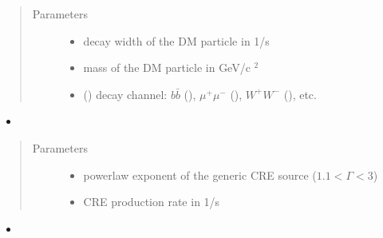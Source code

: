 \documentclass[letterpaper,10pt,english]{sphinxmanual}
\begin{document}
\begin{fulllineitems}
\begin{itemize}
\end{itemize}
\begin{quote}\begin{description}
\item[{Parameters}] \leavevmode\begin{itemize}
\item {} 
\sphinxAtStartPar
{} \textendash{} decay width of the DM particle in 1/s

\item {} 
\sphinxAtStartPar
{} \textendash{} mass of the DM particle in GeV/c \({}^2\)

\item {} 
\sphinxAtStartPar
{} () \textendash{} decay channel: \(b\bar b\) (), \(\mu^+ \mu^-\) (), \(W^+ W^-\) (), etc.

\end{itemize}

\end{description}\end{quote}
\begin{itemize}
\item {} 
\sphinxAtStartPar
{}

\end{itemize}
\begin{quote}\begin{description}
\item[{Parameters}] \leavevmode\begin{itemize}
\item {} 
\sphinxAtStartPar
{} \textendash{} power\sphinxhyphen{}law exponent of the generic CRE source (\(1.1 < \Gamma < 3\))

\item {} 
\sphinxAtStartPar
{} \textendash{} CRE production rate in 1/s

\end{itemize}

\end{description}\end{quote}
\begin{itemize}
\item {} 
\sphinxAtStartPar
{}


\end{itemize}
\end{fulllineitems}
\end{document}
